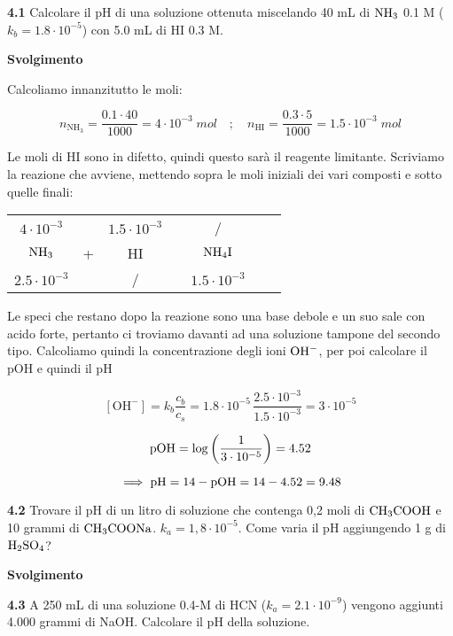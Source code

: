 \textbf{4.1} Calcolare il pH di una soluzione ottenuta miscelando 40 mL di $\rm NH_3$ 0.1 M ($k_b = 1.8 \cdot 10^{-5}$) con 5.0 mL di HI 0.3 M.

\vspace{0.2cm}\large\textbf{Svolgimento}\normalsize

\vspace{0.2cm}Calcoliamo innanzitutto le moli:

$$n_{\text{NH}_3}=\frac{0.1 \cdot 40}{1000}=4 \cdot 10^{-3} \; mol
\quad ; \quad
n_{\text{HI}}=\frac{0.3 \cdot 5}{1000}=1.5 \cdot 10^{-3} \; mol$$

Le moli di HI sono in difetto, quindi questo sarà il reagente limitante. Scriviamo la reazione che avviene, mettendo sopra le moli iniziali dei vari composti e sotto quelle finali:

\begin{center}
    \begin{tabular}{ccccccc}
        $4 \cdot 10^{-3}$ &  & $1.5 \cdot 10^{-3}$ & & /\\
        $\rm NH_3$ & + & HI & \ce{->} & $\rm NH_4I$ \\
        $2.5 \cdot 10^{-3}$ &  &  / & & $1.5 \cdot 10^{-3}$\\
    \end{tabular}
\end{center}

Le speci che restano dopo la reazione sono una base debole e un suo sale con acido forte, pertanto ci troviamo davanti ad una soluzione tampone del secondo tipo. Calcoliamo quindi la concentrazione degli ioni $\rm OH^-$, per poi calcolare il pOH e quindi il pH

$$[\text{OH}^-]=k_b\frac{c_b}{c_s}
=1.8 \cdot 10^{-5}\,\frac{2.5 \cdot 10^{-3}}{1.5 \cdot 10^{-3}}= 3 \cdot 10^{-5}$$

$$\rm pOH=\log\left(\frac{1}{3 \cdot 10^{-5}}\right)=4.52$$

$$\implies \rm pH=14-pOH=14-4.52=9.48$$

\vspace{0.2cm}\textbf{4.2} Trovare il pH di un litro di soluzione che contenga 0,2 moli di $\rm CH_3COOH$ e 10 grammi di $\rm CH_3COONa$. $k_a = 1,8 \cdot 10^{-5}$. Come varia il pH aggiungendo 1 g di $\rm H_2SO_4$?

\vspace{0.2cm}\large\textbf{Svolgimento}\normalsize

\vspace{0.2cm}

\vspace{0.2cm}\textbf{4.3} A 250 mL di una soluzione 0.4-M di HCN ($k_a = 2.1 \cdot 10^{-9}$) vengono aggiunti 4.000 grammi di NaOH. Calcolare il pH della soluzione.

